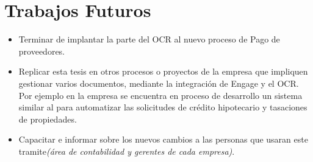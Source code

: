 	
	\section{Trabajos Futuros}
	
	\begin{itemize}
		
		\item Terminar de implantar la parte del OCR al nuevo proceso de Pago de proveedores.
		
		\item Replicar esta tesis en otros procesos o proyectos de la empresa que impliquen gestionar varios documentos, mediante la integración de Engage y el OCR. Por ejemplo en la empresa se encuentra en proceso de desarrollo un sistema similar al para automatizar las solicitudes de crédito hipotecario y tasaciones de propiedades.
		
		\item Capacitar e informar sobre los nuevos cambios a las personas que usaran este tramite\textit{(área de contabilidad y gerentes de cada empresa)}.
	\end{itemize}
	
	